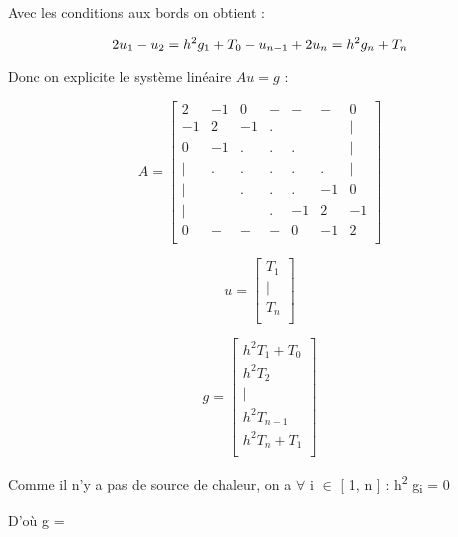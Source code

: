 \documentclass[11pt]{article}
\begin{document}
Avec les conditions aux bords on obtient :

\begin{equation*}
2 u_1 - u_2 = h^2 g_1 + T_0 \\
- u_{n-1} + 2 u_n = h^2 g_n + T_n \\
\end{equation*}

Donc on explicite le système linéaire \(Au = g\) :

\begin{equation*}
A = \left[
\begin{array}{ccccccc}
2 & -1 & 0 & - & - & - & 0 \\
-1 & 2 & -1 & . &  &  & |  \\
0 & -1 & . & . & . &  & |  \\
| & . & . & . & . & . & |  \\
| & & . & . & . & -1 & 0  \\
| & & & . & -1 & 2 & -1  \\
0 & - & - & - & 0 & -1 & 2 \\
\end{array}
\right]
\end{equation*}

\begin{equation*}
u = \left[
\begin{array}{c}
T_1 \\
| \\
T_n \\
\end{array}
\right]
\end{equation*}

\begin{equation*}
g = \left[
\begin{array}{c}
h^2 T_1 + T_0 \\
h^2 T_2 \\
| \\
h^2 T_{n-1} \\
h^2T_n + T_1\\
\end{array}
\right]
\end{equation*}

Comme il n'y a pas de source de chaleur, on a \(\forall\) i \(\in\) [ 1, n
] : h\textsuperscript{2} g\textsubscript{i} = 0

D'où g = \left[
\begin{array}{c}
T_0 \\
0 \\
| \\
0 \\
T_1 \\
\end{array}
\right]
\end{document}
